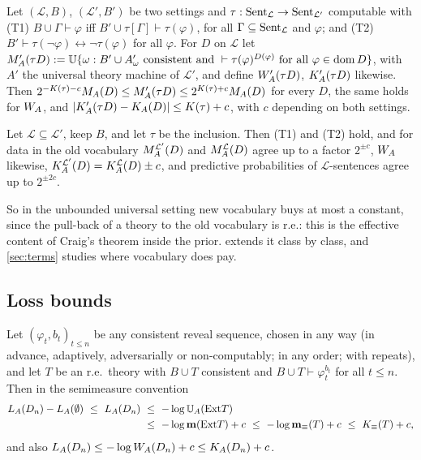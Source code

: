 \begin{theorem}\label{thm:basic:translation}
Let $(\mathcal L,B)$, $(\mathcal L',B')$ be two settings and $\tau:\mathrm{Sent}_{\mathcal L}\to\mathrm{Sent}_{\mathcal L'}$ computable with (T1) $B\cup\Gamma\vdash\varphi$ iff $B'\cup\tau[\Gamma]\vdash\tau(\varphi)$, for all $\Gamma\subseteq\mathrm{Sent}_{\mathcal L}$ and $\varphi$; and (T2) $B'\vdash\tau(\neg\varphi)\leftrightarrow\neg\tau(\varphi)$ for all $\varphi$. For $D$ on $\mathcal L$ let $M_{A}'(\tau D):=\mathbb{U}\{\omega:B'\cup A'_\omega\text{ consistent and }\vdash\tau(\varphi)^{D(\varphi)}\text{ for all }\varphi\in\operatorname{dom} D\}$, with $A'$ the universal theory machine of $\mathcal L'$, and define $W_{A}'(\tau D)$, $K_{A}'(\tau D)$ likewise. Then $2^{-K(\tau)-c}M_{A}(D)\le M_{A}'(\tau D)\le2^{K(\tau)+c}M_{A}(D)$ for every $D$, the same holds for $W_{A}$, and $\lvert K_{A}'(\tau D)-K_{A}(D)\rvert\le K(\tau)+c$, with $c$ depending on both settings.
\end{theorem}

\begin{corollary}\label{cor:basic:vocabulary}
Let $\mathcal L\subseteq\mathcal L'$, keep $B$, and let $\tau$ be the inclusion. Then (T1) and (T2) hold, and for data in the old vocabulary $M_{A}^{\mathcal L'}(D)$ and $M_{A}^{\mathcal L}(D)$ agree up to a factor $2^{\pm c}$, $W_{A}$ likewise, $K_{A}^{\mathcal L'}(D)=K_{A}^{\mathcal L}(D)\pm c$, and predictive probabilities of $\mathcal L$-sentences agree up to $2^{\pm2c}$.
\end{corollary}

So in the unbounded universal setting new vocabulary buys at most a constant, since the pull-back of a theory to the old vocabulary is r.e.: this is the effective content of Craig's theorem \citep{craig1953axiomatizability} inside the prior.  extends it class by class, and \cref{sec:terms} studies where vocabulary does pay.

\subsection{Loss bounds}\label{sec:basic:loss}

\begin{theorem}\label{thm:basic:loss}
Let $(\varphi_t,b_t)_{t\le n}$ be any consistent reveal sequence, chosen in any way (in advance, adaptively, adversarially or non-computably; in any order; with repeats), and let $T$ be an r.e.\ theory with $B\cup T$ consistent and $B\cup T\vdash\varphi_t^{b_t}$ for all $t\le n$. Then in the semimeasure convention
\begin{align*}
L_{A}(D_n)-L_{A}(\emptyset)\ \le\ L_{A}(D_n)\ &\le\ -\log\mathbb{U}_{A}(\mathrm{Ext} T)\\
&\le\ -\log\mathbf{m}(\mathrm{Ext} T)+c\ \le\ -\log\mathbf{m}_{\equiv}(T)+c\ \le\ K_{\equiv}(T)+c,
\end{align*}
and also $L_{A}(D_n)\le-\log W_{A}(D_n)+c\le K_{A}(D_n)+c$.
\end{theorem}

